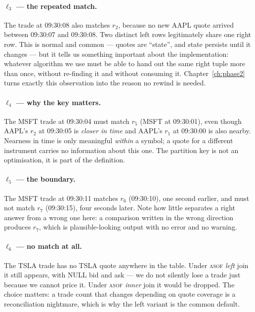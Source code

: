 \documentclass[11pt,a4paper]{report}
\theoremstyle{definition}
\theoremstyle{plain}
\newcommand{\asof}{{\normalfont\scshape asof}}
\begin{document}
\paragraph{$\ell_3$ --- the repeated match.} The trade at 09:30:08 also matches $r_2$,
because no new AAPL quote arrived between 09:30:07 and 09:30:08. Two distinct left rows
legitimately share one right row. This is normal and common --- quotes are ``state'', and
state persists until it changes --- but it tells us something important about the
implementation: whatever algorithm we use must be able to hand out the same right tuple
more than once, without re-finding it and without consuming it. Chapter~\ref{ch:phase2}
turns exactly this observation into the reason no rewind is needed.

\paragraph{$\ell_4$ --- why the key matters.} The MSFT trade at 09:30:04 must match $r_5$
(MSFT at 09:30:01), even though AAPL's $r_2$ at 09:30:05 is \emph{closer in time} and AAPL's
$r_1$ at 09:30:00 is also nearby. Nearness in time is only meaningful \emph{within} a
symbol; a quote for a different instrument carries no information about this one. The
partition key is not an optimisation, it is part of the definition.

\paragraph{$\ell_5$ --- the boundary.} The MSFT trade at 09:30:11 matches $r_6$ (09:30:10),
one second earlier, and must not match $r_7$ (09:30:15), four seconds later. Note how little
separates a right answer from a wrong one here: a comparison written in the wrong direction
produces $r_7$, which is plausible-looking output with no error and no warning.

\paragraph{$\ell_6$ --- no match at all.} The TSLA trade has no TSLA quote anywhere in the
table. Under \asof{} \emph{left} join it still appears, with NULL bid and ask --- we do not
silently lose a trade just because we cannot price it. Under \asof{} \emph{inner} join it
would be dropped. The choice matters: a trade count that changes depending on quote coverage
is a reconciliation nightmare, which is why the left variant is the common default.
\end{document}
